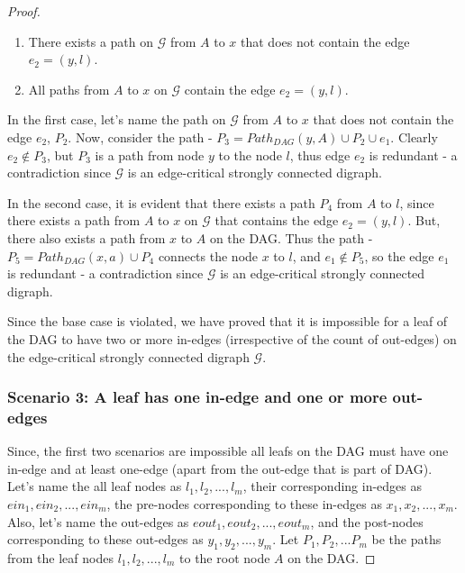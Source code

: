 \documentclass[runningheads]{llncs}
\begin{document}
\begin{proof}
\begin{enumerate}
    \item There exists a path on $\mathcal{G}$ from $A$ to $x$ that does not contain the edge $e_2 = (y, l)$.
    \item All paths from $A$ to $x$ on $\mathcal{G}$ contain the edge $e_2 = (y, l)$.
\end{enumerate}

In the first case, let's name the path on $\mathcal{G}$ from $A$ to $x$ that does not contain the edge $e_2$, $P_2$. Now, consider the path - $P_3 = Path_{DAG}(y, A) \cup P_2 \cup e_1$. Clearly $e_2 \notin P_3$, but $P_3$ is a path from node $y$ to the node $l$, thus edge $e_2$ is redundant - a contradiction since $\mathcal{G}$ is an edge-critical strongly connected digraph.

In the second case, it is evident that there exists a path $P_4$ from $A$ to $l$, since there exists a path from $A$ to $x$ on $\mathcal{G}$ that contains the edge $e_2 = (y, l)$. But, there also exists a path from $x$ to $A$ on the DAG. Thus the path - $P_5 = Path_{DAG}(x, a) \cup P_4$ connects the node $x$ to $l$, and $e_1 \notin P_5$, so the edge $e_1$ is redundant - a contradiction since $\mathcal{G}$ is an edge-critical strongly connected digraph.

Since the base case is violated, we have proved that it is impossible for a leaf of the DAG to have two or more in-edges (irrespective of the count of out-edges) on the edge-critical strongly connected digraph $\mathcal{G}$.

\subsubsection{Scenario 3: A leaf has one in-edge and one or more out-edges} Since, the first two scenarios are impossible all leafs on the DAG must have one in-edge and at least one-edge (apart from the out-edge that is part of DAG). Let's name the all leaf nodes as $l_1, l_2, ... , l_m$, their corresponding in-edges as $ein_1, ein_2, ... , ein_m$, the pre-nodes corresponding to these in-edges as $x_1, x_2, ... , x_m$. Also, let's name the out-edges as $eout_1, eout_2, ... , eout_m$, and the post-nodes corresponding to these out-edges as $y_1, y_2, ... , y_m$. Let $P_1, P_2, ... P_m$ be the paths from the leaf nodes $l_1, l_2, ..., l_m$ to the root node $A$ on the DAG.



\end{proof}
\end{document}
